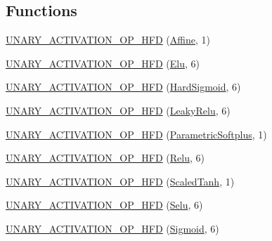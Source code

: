 \subsection*{Functions}
\begin{DoxyCompactItemize}
\item 
\mbox{\hyperlink{namespaceonnxruntime_1_1cuda_a527f8290d15a8af5de399ab37e5e09be}{U\+N\+A\+R\+Y\+\_\+\+A\+C\+T\+I\+V\+A\+T\+I\+O\+N\+\_\+\+O\+P\+\_\+\+H\+FD}} (\mbox{\hyperlink{classonnxruntime_1_1cuda_1_1Affine}{Affine}}, 1)
\item 
\mbox{\hyperlink{namespaceonnxruntime_1_1cuda_a457e002c7b285279e4fc144ac8800a0b}{U\+N\+A\+R\+Y\+\_\+\+A\+C\+T\+I\+V\+A\+T\+I\+O\+N\+\_\+\+O\+P\+\_\+\+H\+FD}} (\mbox{\hyperlink{classonnxruntime_1_1cuda_1_1Elu}{Elu}}, 6)
\item 
\mbox{\hyperlink{namespaceonnxruntime_1_1cuda_a647634cf5625dc6d0c46b122d5e1e221}{U\+N\+A\+R\+Y\+\_\+\+A\+C\+T\+I\+V\+A\+T\+I\+O\+N\+\_\+\+O\+P\+\_\+\+H\+FD}} (\mbox{\hyperlink{classonnxruntime_1_1cuda_1_1HardSigmoid}{Hard\+Sigmoid}}, 6)
\item 
\mbox{\hyperlink{namespaceonnxruntime_1_1cuda_a2747eea2d00e0518acf1a160deeb2d39}{U\+N\+A\+R\+Y\+\_\+\+A\+C\+T\+I\+V\+A\+T\+I\+O\+N\+\_\+\+O\+P\+\_\+\+H\+FD}} (\mbox{\hyperlink{classonnxruntime_1_1cuda_1_1LeakyRelu}{Leaky\+Relu}}, 6)
\item 
\mbox{\hyperlink{namespaceonnxruntime_1_1cuda_af6d6a194db4dc1a50154c7d22d7890bd}{U\+N\+A\+R\+Y\+\_\+\+A\+C\+T\+I\+V\+A\+T\+I\+O\+N\+\_\+\+O\+P\+\_\+\+H\+FD}} (\mbox{\hyperlink{classonnxruntime_1_1cuda_1_1ParametricSoftplus}{Parametric\+Softplus}}, 1)
\item 
\mbox{\hyperlink{namespaceonnxruntime_1_1cuda_aa13e51314d19d5fbde9f8467e0d1c874}{U\+N\+A\+R\+Y\+\_\+\+A\+C\+T\+I\+V\+A\+T\+I\+O\+N\+\_\+\+O\+P\+\_\+\+H\+FD}} (\mbox{\hyperlink{classonnxruntime_1_1cuda_1_1Relu}{Relu}}, 6)
\item 
\mbox{\hyperlink{namespaceonnxruntime_1_1cuda_af35bccb7c8f0e7f723e032ddbef92627}{U\+N\+A\+R\+Y\+\_\+\+A\+C\+T\+I\+V\+A\+T\+I\+O\+N\+\_\+\+O\+P\+\_\+\+H\+FD}} (\mbox{\hyperlink{classonnxruntime_1_1cuda_1_1ScaledTanh}{Scaled\+Tanh}}, 1)
\item 
\mbox{\hyperlink{namespaceonnxruntime_1_1cuda_af0582ac122e40e805fc2942d9602172a}{U\+N\+A\+R\+Y\+\_\+\+A\+C\+T\+I\+V\+A\+T\+I\+O\+N\+\_\+\+O\+P\+\_\+\+H\+FD}} (\mbox{\hyperlink{classonnxruntime_1_1cuda_1_1Selu}{Selu}}, 6)
\item 
\mbox{\hyperlink{namespaceonnxruntime_1_1cuda_a464ec829c08f0fb929b9349560ccc300}{U\+N\+A\+R\+Y\+\_\+\+A\+C\+T\+I\+V\+A\+T\+I\+O\+N\+\_\+\+O\+P\+\_\+\+H\+FD}} (\mbox{\hyperlink{classonnxruntime_1_1cuda_1_1Sigmoid}{Sigmoid}}, 6)

\end{DoxyCompactItemize}
